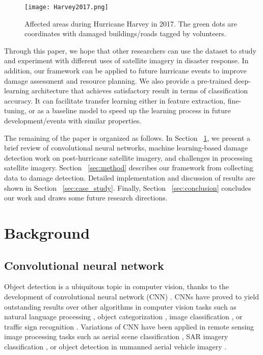 \documentclass[journal, 12pt, onecolumn,draftclsnofoot]{IEEEtran}
\begin{document}
\begin{figure}[h]{\centering
\texttt{[image: Harvey2017.png]} \\
\centering\caption{\small{Affected areas during Hurricane Harvey in 2017. The green dots are coordinates with damaged buildings/roads tagged by volunteers.}}
\label{fig:Harvey}
}
\end{figure}

Through this paper, we hope that other researchers can use the dataset to study and experiment with different uses of satellite imagery in disaster response. In addition, our framework can be applied to future hurricane events to improve damage assessment and resource planning. We also provide a pre-trained deep-learning architecture that achieves satisfactory result in terms of classification accuracy. It can facilitate transfer learning either in feature extraction, fine-tuning, or as a baseline model to speed up the learning process in future development/events with similar properties. 

The remaining of the paper is organized as follows. In Section ~\ref{sec:background}, we present a brief review of convolutional neural networks, machine learning-based damage detection work on post-hurricane satellite imagery, and challenges in processing satellite imagery. Section ~\ref{sec:method} describes our framework from collecting data to damage detection. Detailed implementation and discussion of results are shown in Section ~\ref{sec:case_study}. Finally, Section ~\ref{sec:conclusion} concludes our work and draws some future research directions. 













\section{Background}\label{sec:background}
\subsection{Convolutional neural network}
Object detection is a ubiquitous topic in computer vision, thanks to the development of convolutional neural network (CNN) \cite{cnn}. CNNs have proved to yield outstanding results over other algorithms in computer vision tasks such as natural language processing \cite{cnn-nlp}, object categorization \cite{cnn-object}, image classification \cite{cnn-image,cnn-imagenet}, or traffic sign recognition \cite{trafficSign}. Variations of CNN have been applied in remote sensing image processing tasks \cite{Zhang2016} such as aerial scene classification \cite{aid, aerial-label, scene-multiscale}, SAR imagery classification \cite{sar-cnn}, or object detection in unmanned aerial vehicle imagery \cite{Bazi2018}.
\end{document}
